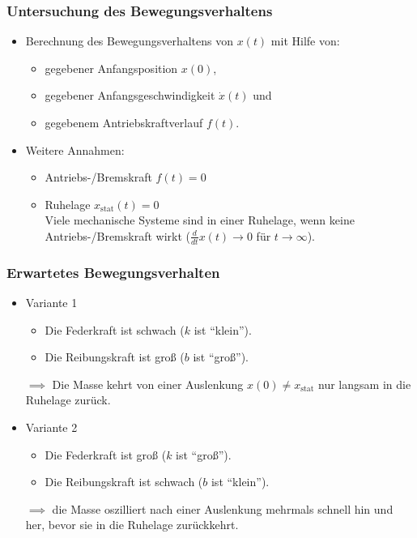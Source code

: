 \documentclass[a4paper, 11pt, accentcolor = tud3b]{tudreport}
\begin{document}
				\subsubsection{Untersuchung des Bewegungsverhaltens} %
					\begin{itemize}
						\item Berechnung des Bewegungsverhaltens von \(x(t)\) mit Hilfe von:
							\begin{itemize}
								\item gegebener Anfangsposition \(x(0)\),
								\item gegebener Anfangsgeschwindigkeit \(\dot{x}(t)\) und
								\item gegebenem Antriebskraftverlauf \(f(t)\).
							\end{itemize}
						\item Weitere Annahmen:
							\begin{itemize}
								\item Antriebs-/Bremskraft \(f(t) = 0\)
								\item Ruhelage \( x _ \text{stat} (t) = 0 \) \\ Viele mechanische Systeme sind in einer Ruhelage, wenn keine Antriebs-/Bremskraft wirkt (\( \frac{d}{dt}x(t)  \rightarrow 0 \) für \( t \rightarrow \infty \)).
							\end{itemize}
					\end{itemize}
				
				\subsubsection{Erwartetes Bewegungsverhalten} %
					\begin{itemize}
						\item Variante 1
							\begin{itemize}
								\item Die Federkraft ist schwach (\(k\) ist \enquote{klein}).
								\item Die Reibungskraft ist groß (\(b\) ist \enquote{groß}).
							\end{itemize}
							\(\implies\) Die Masse kehrt von einer Auslenkung \( x(0) \neq x _ \text{stat} \) nur langsam in die Ruhelage zurück.
						\item Variante 2
							\begin{itemize}
								\item Die Federkraft ist groß (\(k\) ist \enquote{groß}).
								\item Die Reibungskraft ist schwach (\(b\) ist \enquote{klein}).
							\end{itemize}
							\( \implies \) die Masse oszilliert nach einer Auslenkung mehrmals schnell hin und her, bevor sie in die Ruhelage zurückkehrt.
					\end{itemize}
				
\end{document}
